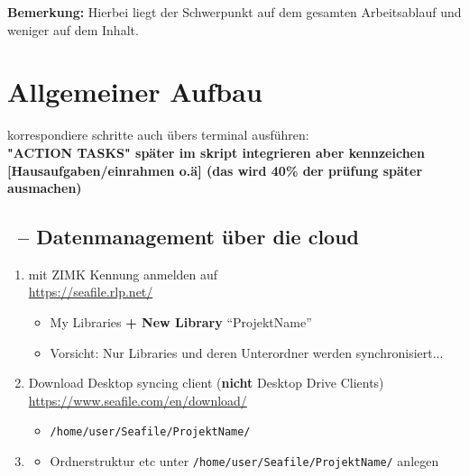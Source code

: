 \textbf{Bemerkung:} Hierbei liegt der Schwerpunkt auf dem gesamten Arbeitsablauf und weniger auf dem Inhalt.


\section{Allgemeiner Aufbau}
korrespondiere schritte auch übers terminal ausführen:\\

\textbf{\color{red} "ACTION TASKS" später im skript integrieren aber kennzeichen [Hausaufgaben/einrahmen o.ä] (das wird 40\% der prüfung später ausmachen)}
\subsection{\seafile~-- Datenmanagement über die cloud}
\begin{enumerate}
	\item mit ZIMK Kennung anmelden auf\\
	      \url{https://seafile.rlp.net/}
	      \begin{itemize}
		      \item My Libraries \textbf{+ New Library} ``ProjektName''
		      \item {\color{red}Vorsicht:} Nur Libraries und deren Unterordner werden synchronisiert...
	      \end{itemize}
	\item Download Desktop syncing client (\textbf{nicht} Desktop Drive Clients)\\
	      \url{https://www.seafile.com/en/download/}
	      \begin{itemize}
		      \item \texttt{/home/user/Seafile/ProjektName/}
	      \end{itemize}
	\item \textbf{\filemanager}
	      \begin{itemize}
		      \item Ordnerstruktur etc unter \texttt{/home/user/Seafile/ProjektName/} anlegen
	      \end{itemize}
\end{enumerate}


